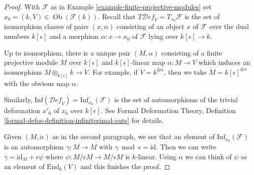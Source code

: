 \documentclass[10pt,a4paper]{amsart}
\theoremstyle{plain}
\theoremstyle{definition}
\theoremstyle{remark}
\numberwithin{equation}{subsection}
\def\Ob{\mathop{\mathrm{Ob}}\nolimits}
\def\Deformationcategory{\mathcal{D}\!\mathit{ef}}
\begin{document}
\begin{proof}
With $\mathcal{F}$ as in Example \ref{example-finite-projective-modules}
set $x_0 = (k, V) \in \Ob(\mathcal{F}(k))$.
Recall that $T\Deformationcategory_V = T_{x_0}\mathcal{F}$
is the set of isomorphism
classes of pairs $(x, \alpha)$ consisting of an object $x$ of $\mathcal{F}
$ over the dual numbers $k[\epsilon]$ and a morphism
$\alpha : x \to x_0$ of $\mathcal{F}$ lying over $k[\epsilon] \to k$.

\medskip\noindent
Up to isomorphism, there is a unique pair $(M, \alpha)$ consisting of a
finite projective module $M$ over $k[\epsilon]$
and $k[\epsilon]$-linear map $\alpha : M \to V$
which induces an isomorphism $M \otimes_{k[\epsilon]} k \to V$.
For example, if $V = k^{\oplus n}$, then we take
$M = k[\epsilon]^{\oplus n}$ with the obvious map $\alpha$.

\medskip\noindent
Similarly, $\text{Inf}(\Deformationcategory_V) = \text{Inf}_{x_0}(\mathcal{F})$
is the set of automorphisms
of the trivial deformation $x'_0$ of $x_0$ over $k[\epsilon]$.
See Formal Deformation Theory, Definition
\ref{formal-defos-definition-infinitesimal-auts} for details.

\medskip\noindent
Given $(M, \alpha)$ as in the second paragraph, we see that an element of
$\text{Inf}_{x_0}(\mathcal{F})$ is an automorphism $\gamma : M \to M$ with
$\gamma \bmod \epsilon = \text{id}$. Then we can write
$\gamma = \text{id}_M + \epsilon \psi$ where
$\psi : M/\epsilon M \to M/\epsilon M$ is $k$-linear.
Using $\alpha$ we can think of $\psi$ as an element of
$\text{End}_k(V)$ and this finishes the proof.
\end{proof}
\end{document}
